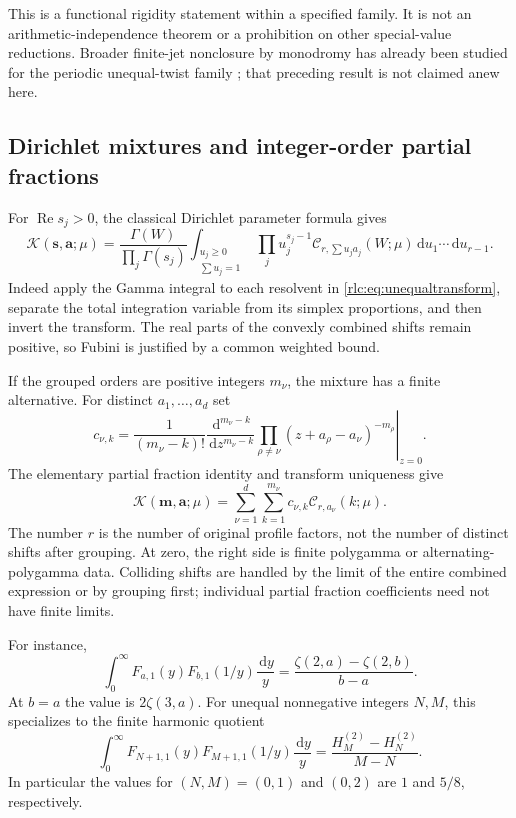 \documentclass[11pt,a4paper]{article}
\numberwithin{equation}{section}
\theoremstyle{definition}\newtheorem{definition}[theorem]{Definition}
\theoremstyle{remark}\newtheorem{remark}[theorem]{Remark}
\DeclareMathOperator{\Rea}{Re}
\newcommand{\dd}{\,\mathrm d}
\newcommand{\CC}{\mathcal C}
\begin{document}
This is a functional rigidity statement within a specified family.
It is not an arithmetic-independence theorem or a prohibition on other
special-value reductions. Broader finite-jet nonclosure by monodromy
has already been studied for the periodic unequal-twist family
\cite{UTJ}; that preceding result is not claimed anew here.

\subsection{Dirichlet mixtures and integer-order partial fractions}
For $\Rea s_j>0$, the classical Dirichlet parameter formula gives
\begin{equation}\label{rlc:eq:simplex}
 \mathcal K(\boldsymbol s,\boldsymbol a;\mu)
 =\frac{\Gamma(W)}{\prod_j\Gamma(s_j)}
 \int_{\substack{u_j\ge0\\\sum u_j=1}}
       \prod_j u_j^{s_j-1}
       \CC_{r,\sum u_ja_j}(W;\mu)\dd u_1\cdots\dd u_{r-1}.
\end{equation}
Indeed apply the Gamma integral to each resolvent in
\eqref{rlc:eq:unequaltransform}, separate the total integration variable
from its simplex proportions, and then invert the transform. The real
parts of the convexly combined shifts remain positive, so Fubini is
justified by a common weighted bound.

If the grouped orders are positive integers $m_\nu$, the mixture has a
finite alternative. For distinct $a_1,\ldots,a_d$ set
\begin{equation}\label{rlc:eq:partialcoeff}
 c_{\nu,k}=\frac1{(m_\nu-k)!}
 \left.\frac{\dd^{m_\nu-k}}{\dd z^{m_\nu-k}}
 \prod_{\rho\ne\nu}(z+a_\rho-a_\nu)^{-m_\rho}\right|_{z=0}.
\end{equation}
The elementary partial fraction identity and transform uniqueness give
\begin{equation}\label{rlc:eq:partialclosure}
 \boxed{\displaystyle
 \mathcal K(\boldsymbol m,\boldsymbol a;\mu)
       =\sum_{\nu=1}^{d}\sum_{k=1}^{m_\nu}
             c_{\nu,k}\CC_{r,a_\nu}(k;\mu).}
\end{equation}
The number $r$ is the number of original profile factors, not the number
of distinct shifts after grouping. At zero, the right side is finite
polygamma or alternating-polygamma data. Colliding shifts are handled
by the limit of the entire combined expression or by grouping first;
individual partial fraction coefficients need not have finite limits.

For instance,
\begin{equation}\label{rlc:eq:unequal11}
 \int_0^\infty F_{a,1}(y)F_{b,1}(1/y)\frac{\dd y}{y}
       =\frac{\zeta(2,a)-\zeta(2,b)}{b-a}.
\end{equation}
At $b=a$ the value is $2\zeta(3,a)$. For unequal nonnegative integers
$N,M$, this specializes to the finite harmonic quotient
\begin{equation}\label{rlc:eq:unequalharmonic}
 \int_0^\infty F_{N+1,1}(y)F_{M+1,1}(1/y)\frac{\dd y}{y}
       =\frac{H_M^{(2)}-H_N^{(2)}}{M-N}.
\end{equation}
In particular the values for $(N,M)=(0,1)$ and $(0,2)$ are $1$ and
$5/8$, respectively.
\end{document}
